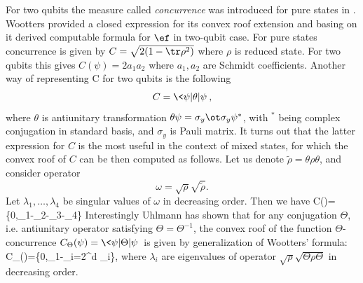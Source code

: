\documentclass[rmp,12pt,preprint]{revtex4-2}
\begin{document}
For two qubits the measure called {\it concurrence} was introduced
for pure states in \cite{Hill-Wootters}. Wootters
\cite{Wootters-conc} provided a closed expression for its convex
roof extension and basing on it derived computable formula for $\ef$
in two-qubit case. For pure states concurrence is given by
$C=\sqrt{2(1- \tr \rho^2)}$ where $\rho$ is reduced state. For two
qubits this gives $C(\psi)=2a_1a_2$ where $a_1,a_2$ are Schmidt
coefficients. Another way of representing C for two qubits is the
following \begin{equation} C=\<\psi|\theta|\psi\>, \end{equation} where $\theta$ is
antiunitary transformation $\theta \psi=\sigma_y\ot \sigma_y
\psi^*$, with ${}^*$ being complex conjugation in standard basis,
and $\sigma_y$ is Pauli matrix. It turns out that the latter
expression for $C$ is the most useful in the context of mixed
states, for which the convex roof of $C$ can be then computed as
follows. Let us denote $\tilde\rho=\theta \rho \theta$, and consider
operator \begin{equation} \omega=\sqrt \rho \sqrt {\tilde \rho}. \end{equation} Let
$\lambda_1,\ldots,\lambda_4$ be singular values of $\omega$ in
decreasing order. Then we have \be
C(\rho)=\max\{0,\lambda_1-\lambda_2-\lambda_3-\lambda_4\}
\label{eq:concurrence} \ee Interestingly Uhlmann has shown
\cite{Uhlmann2000-conj} that for any conjugation $\Theta$, i.e.
antiunitary operator satisfying $\Theta=\Theta^{-1}$, the convex
roof of the function $\Theta$-concurrence
$C_\Theta(\psi)=\<\psi|\Theta|\psi\>$ is given by generalization of
Wootters'  formula: \be
C_\Theta(\rho)=\max\{0,\lambda_1-\sum_{i=2}^d \lambda_i\}, \ee where
$\lambda_i$ are  eigenvalues  of operator $\sqrt {\rho} \sqrt{\Theta
\rho \Theta}$ in decreasing order.
\end{document}
